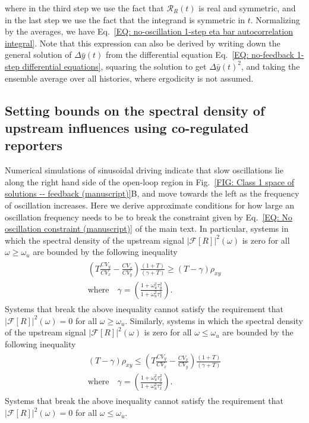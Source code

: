 \documentclass[%
 reprint,prx,
superscriptaddress,
%
%
%
%
%
%
%
%
%
 amsmath,amssymb,
 aps,
%
%
%
%
%
%
]{revtex4-2}
\begin{document}
where in the third step we use the fact that $\mathcal{R}_{R}(t)$ is real and symmetric, and in the last step we use the fact that the integrand is symmetric in $t$. Normalizing by the averages, we have  Eq.~\eqref{EQ: no-oscillation 1-step eta bar autocorrelation integral}. Note that this expression can also be derived by writing down the general solution of $\Delta \bar{y}(t)$ from the differential equation Eq.~\eqref{EQ: no-feedback 1-step differential equations}, squaring the solution to get $\Delta \bar{y}(t)^{2}$, and taking the ensemble average over all histories, where ergodicity is not assumed.






\subsection*{Setting bounds on the spectral density of upstream influences using co-regulated reporters}
Numerical simulations of sinusoidal driving indicate that slow oscillations lie along the right hand side of the open-loop region in Fig.~\ref{FIG: Class 1 space of solutions -- feedback (manuscript)}B, and move towards the left as the frequency of oscillation increases. Here we derive approximate conditions for how large an oscillation frequency needs to be to break the constraint given by Eq.~\eqref{EQ: No oscillation constraint (manuscript)} of the main text. In particular, systems in which the spectral density of the upstream signal $|\mathcal{F}[R]|^{2}(\omega)$ is zero for all $\omega \geq \omega_{u}$ 
are bounded by the following inequality 
\begin{align}
\begin{split}
 \left(T\frac{CV_{y}}{CV_{x}} - \frac{CV_{x}}{CV_{y}}\right)\frac{(1+T)}{(\gamma+T)} \geq (T - \gamma)\rho_{xy} \\ \text{where} \quad \gamma = \left(\frac{1 + \omega_{u}^{2}\tau_{y}^{2}}{1 + \omega_{u}^{2}\tau_{x}^{2}}\right). 
 \end{split}
 \label{EQ: spec 1}
\end{align}
Systems that break the above inequality cannot satisfy the requirement that $|\mathcal{F}[R]|^{2}(\omega) = 0$ for all $\omega \geq \omega_{u}$. 
Similarly, systems in which the spectral density of the upstream signal $|\mathcal{F}[R]|^{2}(\omega)$ is zero for all $\omega \leq \omega_{u}$  
are bounded by the following inequality
\begin{align}
\begin{split}
 (T - \gamma)\rho_{xy} \leq \left(T\frac{CV_{y}}{CV_{x}} - \frac{CV_{x}}{CV_{y}}\right)\frac{(1+T)}{(\gamma+T)}  \\ \text{where} \quad \gamma = \left(\frac{1 + \omega_{u}^{2}\tau_{y}^{2}}{1 + \omega_{u}^{2}\tau_{x}^{2}}\right) .
\end{split}
 \label{EQ: spec 2}
\end{align}
Systems that break the above inequality cannot satisfy the requirement that $|\mathcal{F}[R]|^{2}(\omega) = 0$ for all $\omega \leq \omega_{u}$. \\
\end{document}
